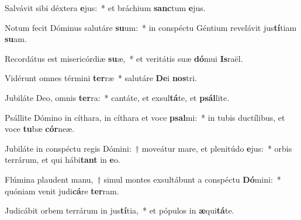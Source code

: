 \item Salvávit sibi déxtera \textbf{e}jus:~* et bráchium \textbf{sanc}tum \textbf{e}jus.
\item Notum fecit Dóminus salutáre \textbf{su}um:~* in conspéctu Géntium revelávit jus\textbf{tí}tiam \textbf{su}am.
\item Recordátus est misericórdiæ \textbf{su}æ,~* et veritátis suæ \textbf{dó}mui \textbf{Is}raël.
\item Vidérunt omnes términi \textbf{ter}ræ~* salutáre \textbf{De}i \textbf{nos}tri.
\item Jubiláte Deo, omnis \textbf{ter}ra:~* cantáte, et exsul\textbf{tá}te, et \textbf{psál}lite.
\item Psállite Dómino in cíthara, in cíthara et voce \textbf{psal}mi:~* in tubis ductílibus, et voce \textbf{tu}bæ \textbf{cór}neæ.
\item Jubiláte in conspéctu regis Dómini:~† moveátur mare, et plenitúdo \textbf{e}jus:~* orbis terrárum, et qui hábi\textbf{tant} in \textbf{e}o.
\item Flúmina plaudent manu,~† simul montes exsultábunt a conspéctu \textbf{Dó}mini:~* quóniam venit judi\textbf{cá}re \textbf{ter}ram.
\item Judicábit orbem terrárum in jus\textbf{tí}tia,~* et pópulos in \textbf{æ}qui\textbf{tá}te.
